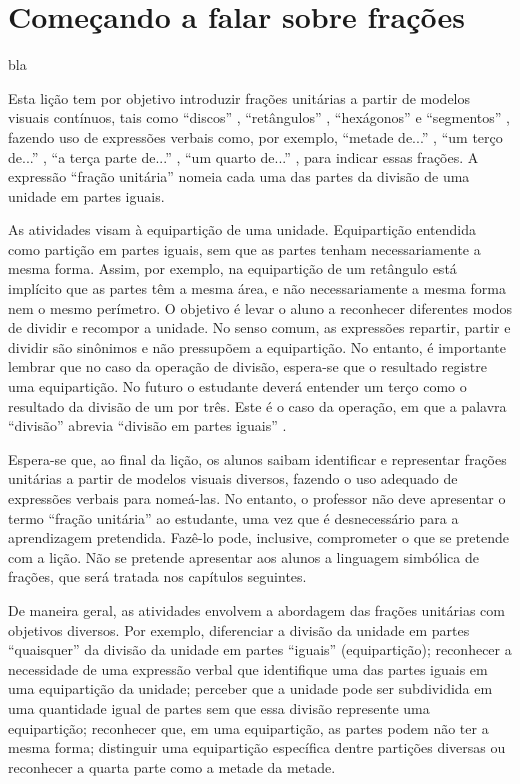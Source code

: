 \documentclass[a4paper,12pt,twoside]{book}
\begin{document}
\chapter{Começando a falar sobre frações }

bla




\begin{professor*}[breakable]{}{}   Esta lição tem por objetivo introduzir frações unitárias a partir de modelos visuais contínuos, tais como   ``discos''  ,   ``retângulos''  ,   ``hexágonos''   e   ``segmentos''  , fazendo uso de expressões verbais como, por exemplo,   ``metade de...''  ,   ``um terço de...''  ,   ``a terça parte de...''  ,   ``um quarto de...''  , para indicar essas frações.   
  A expressão   ``fração unitária''   nomeia cada uma das partes da divisão de uma unidade em partes iguais.  
  
  As atividades visam à equipartição de uma unidade. Equipartição entendida como partição em partes iguais, sem que as partes tenham necessariamente a mesma forma. Assim, por exemplo, na equipartição de um retângulo está implícito que as partes têm a mesma área, e não necessariamente a mesma forma nem o mesmo perímetro. O objetivo é levar o aluno a reconhecer diferentes modos de dividir e recompor a unidade. No senso comum, as expressões repartir, partir e dividir são sinônimos e não pressupõem a equipartição. No entanto, é importante lembrar que no caso da operação de divisão, espera-se que o resultado registre uma equipartição. No futuro o estudante deverá entender um terço como o resultado da divisão de um por três. Este é o caso da operação, em que a palavra   ``divisão''   abrevia   ``divisão em partes iguais''  .  
  
  Espera-se que, ao final da lição, os alunos saibam identificar e representar frações unitárias a partir de modelos visuais diversos, fazendo o uso adequado de expressões verbais para nomeá-las. No entanto, o professor não deve apresentar o termo   ``fração unitária''   ao estudante, uma vez que é desnecessário para a aprendizagem pretendida. Fazê-lo pode, inclusive, comprometer o que se pretende com a lição. Não se pretende apresentar aos alunos a linguagem simbólica de frações, que será tratada nos capítulos seguintes.  
  
  De maneira geral, as atividades envolvem a abordagem das frações unitárias com objetivos diversos. Por exemplo, diferenciar a divisão da unidade em partes   ``quaisquer''   da divisão da unidade em partes   ``iguais''   (equipartição); reconhecer a necessidade de uma expressão verbal que identifique uma das partes iguais em uma equipartição da unidade; perceber que a unidade pode ser subdividida em uma quantidade igual de partes sem que essa divisão represente uma equipartição; reconhecer que, em uma equipartição, as partes podem não ter a mesma forma; distinguir uma equipartição específica dentre partições diversas ou reconhecer a quarta parte como a metade da metade.  
  

\end{professor*}
\end{document}
